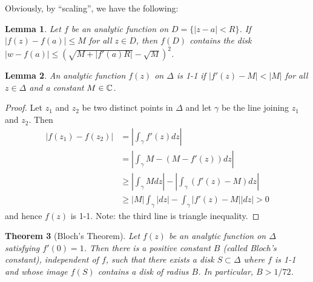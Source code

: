 \documentclass[11pt]{amsart}
\newtheorem{thm}{Theorem}[section]
\newtheorem{lem}[thm]{Lemma}
\theoremstyle{remark}
\theoremstyle{definition}
\numberwithin{equation}{section}
\begin{document}
Obviously, by ``scaling'', we have the following:

\begin{lem}\label{LEM000102}
    Let $f$ be an analytic function on $D = \{|z-a|<R\}$. If $|f(z) - f(a)| \le M$ for all $z\in D$, then
    $f(D)$ contains the disk $|w - f(a)| \le (\sqrt{M + |f'(a) R|} - \sqrt{M})^2$.
\end{lem}

\begin{lem}\label{LEM000101}
    An analytic function $f(z)$ on $\Delta$ is 1-1 if $|f'(z) - M| < |M|$ for all
    $z\in \Delta$ and a constant $M\in {\mathbb C}$.
\end{lem}

\begin{proof}
    Let $z_1$ and $z_2$ be two distinct points in $\Delta$ and let $\gamma$ be the line joining
    $z_1$ and $z_2$. Then
    \begin{equation}\label{E000102}
        \begin{split}
            |f(z_1) - f(z_2)| & = \left|\int_\gamma f'(z) dz\right|                                         \\
                              & = \left| \int_\gamma M - (M - f'(z)) dz\right|                              \\
                              & \ge \left|\int_\gamma M dz\right| - \left|\int_\gamma (f'(z) - M) dz\right| \\
                              & \ge |M| \int_\gamma |dz| - \int_\gamma |f'(z) - M| |dz| > 0
        \end{split}
    \end{equation}
    and hence $f(z)$ is 1-1. Note: the third line is triangle inequality.
\end{proof}

\begin{thm}[Bloch's Theorem]\label{THM000900}
    Let $f(z)$ be an analytic function on $\Delta$ satisfying $f'(0) = 1$. Then there is a positive
    constant $B$ (called {\it Bloch's constant\/}), independent of $f$, such that
    there exists a disk $S \subset \Delta$ where $f$ is 1-1 and whose image $f(S)$ contains a disk
    of radius $B$. In particular, $B > 1/72$.
\end{thm}
\end{document}
